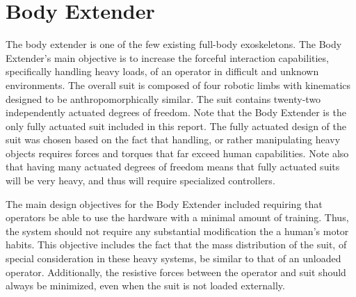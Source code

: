 


%
\section{Body Extender}

The body extender is one of the few existing full-body exoskeletons.  The Body Extender's main objective is to increase the forceful interaction capabilities, specifically handling heavy loads, of an operator in difficult and unknown environments.  The overall suit is composed of four robotic limbs with kinematics designed to be anthropomorphically similar.  The suit contains twenty-two independently actuated degrees of freedom.  Note that the Body Extender is the only fully actuated suit included in this report.  The fully actuated design of the suit was chosen based on the fact that handling, or rather manipulating heavy objects requires forces and torques that far exceed human capabilities.  Note also that having many actuated degrees of freedom means that fully actuated suits will be very heavy, and thus will require specialized controllers.

The main design objectives for the Body Extender included  requiring that operators be able to use the hardware with a minimal amount of training.  Thus, the system should not require any substantial modification the a human's motor habits.  This objective includes the fact that the mass distribution of the suit, of special consideration in these heavy systems, be similar to that of an unloaded operator.  Additionally, the resistive forces between the operator and suit should always be minimized, even when the suit is not loaded externally. 

